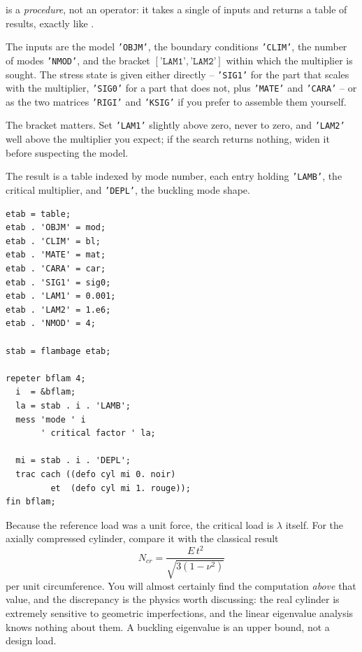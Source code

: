 \begin{castemcom}
  is a \emph{procedure}, not an operator: it
takes a single  of inputs and returns a table of results, exactly
like .

%
%
%
The inputs are the model \texttt{'OBJM'}, the boundary conditions
\texttt{'CLIM'}, the number of modes \texttt{'NMOD'}, and the bracket
$[\texttt{'LAM1'},\texttt{'LAM2'}]$ within which the multiplier is sought.
The stress state is given either directly -- \texttt{'SIG1'} for the part that
scales with the multiplier, \texttt{'SIG0'} for a part that does not, plus
\texttt{'MATE'} and \texttt{'CARA'} -- or as the two matrices
\texttt{'RIGI'} and \texttt{'KSIG'} if you prefer to assemble them yourself.

\medskip
The bracket matters. Set \texttt{'LAM1'} slightly above zero, never to zero,
and \texttt{'LAM2'} well above the multiplier you expect; if the search
returns nothing, widen it before suspecting the model.

The result is a table indexed by mode number, each entry holding
\texttt{'LAMB'}, the critical multiplier, and \texttt{'DEPL'}, the buckling
mode shape.
\end{castemcom}
\begin{castemlines}
\begin{verbatim}
etab = table;
etab . 'OBJM' = mod;
etab . 'CLIM' = bl;
etab . 'MATE' = mat;
etab . 'CARA' = car;
etab . 'SIG1' = sig0;
etab . 'LAM1' = 0.001;
etab . 'LAM2' = 1.e6;
etab . 'NMOD' = 4;

stab = flambage etab;

repeter bflam 4;
  i  = &bflam;
  la = stab . i . 'LAMB';
  mess 'mode ' i
       ' critical factor ' la;

  mi = stab . i . 'DEPL';
  trac cach ((defo cyl mi 0. noir)
         et  (defo cyl mi 1. rouge));
fin bflam;
\end{verbatim}
\end{castemlines}

\noindent Because the reference load was a unit force, the critical load is
$\lambda$ itself. For the axially compressed cylinder, compare it with the
classical result
\[ N_{cr} = \frac{E\,t^{2}}{\sqrt{3(1-\nu^{2})}} \]
%
per unit circumference. You will almost certainly find the computation
\emph{above} that value, and the discrepancy is the physics worth discussing:
the real cylinder is extremely sensitive to geometric imperfections, and the
linear eigenvalue analysis knows nothing about them. A buckling eigenvalue is
an upper bound, not a design load.

